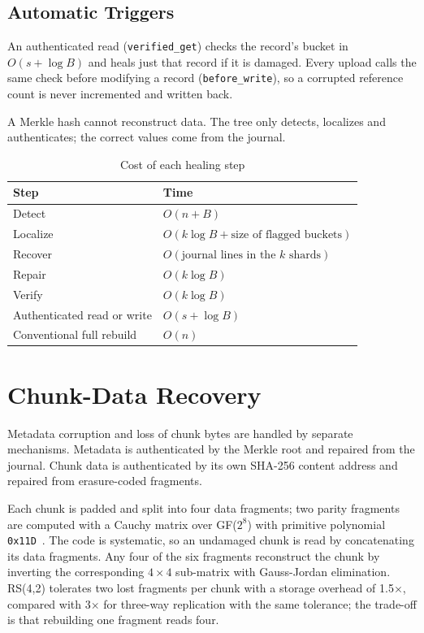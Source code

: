 \documentclass[conference]{IEEEtran}
\newcommand{\code}[1]{\texttt{#1}}
\begin{document}
\subsection{Automatic Triggers}
An authenticated read (\code{verified\_get}) checks the record's bucket in $O(s + \log B)$ and heals just that record if it is damaged. Every upload calls the same check before modifying a record (\code{before\_write}), so a corrupted reference count is never incremented and written back.

A Merkle hash cannot reconstruct data. The tree only detects, localizes and authenticates; the correct values come from the journal.

\begin{table}[t]
\centering
\caption{Cost of each healing step}
\label{tab:complexity}
\small
\begin{tabular}{@{}ll@{}}
\toprule
Step & Time \\
\midrule
Detect & $O(n + B)$ \\
Localize & $O(k \log B + \text{size of flagged buckets})$ \\
Recover & $O(\text{journal lines in the } k \text{ shards})$ \\
Repair & $O(k \log B)$ \\
Verify & $O(k \log B)$ \\
Authenticated read or write & $O(s + \log B)$ \\
Conventional full rebuild & $O(n)$ \\
\bottomrule
\end{tabular}
\end{table}

\section{Chunk-Data Recovery}
\label{sec:chunks}

Metadata corruption and loss of chunk bytes are handled by separate mechanisms. Metadata is authenticated by the Merkle root and repaired from the journal. Chunk data is authenticated by its own SHA-256 content address and repaired from erasure-coded fragments.

Each chunk is padded and split into four data fragments; two parity fragments are computed with a Cauchy matrix over GF($2^8$) with primitive polynomial \code{0x11D}~\cite{reedsolomon}. The code is systematic, so an undamaged chunk is read by concatenating its data fragments. Any four of the six fragments reconstruct the chunk by inverting the corresponding $4 \times 4$ sub-matrix with Gauss-Jordan elimination. RS(4,2) tolerates two lost fragments per chunk with a storage overhead of 1.5$\times$, compared with 3$\times$ for three-way replication with the same tolerance; the trade-off is that rebuilding one fragment reads four.
\end{document}
